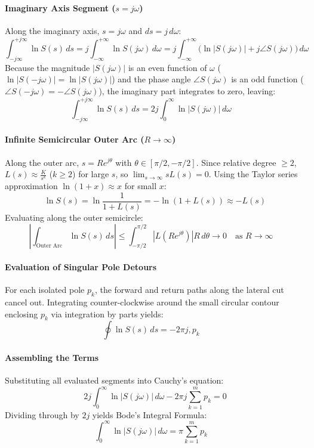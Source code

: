 \documentclass[12pt,onecolumn,twoside ]{article}
\begin{document}
	\paragraph{Imaginary Axis Segment ($s = j\omega$)}
	Along the imaginary axis, $s = j\omega$ and $ds = j\, d\omega$: \[
	\int_{-j\infty}^{+j\infty} \ln S(s)\, ds = j \int_{-\infty}^{+\infty} \ln S(j\omega)\, d\omega = j \int_{-\infty}^{+\infty} \big( \ln |S(j\omega)| + j \angle S(j\omega) \big)\, d\omega \quad
	\] Because the magnitude $|S(j\omega)|$ is an even function of $\omega$ ($\ln |S(-j\omega)| = \ln |S(j\omega)|$) and the phase angle $\angle S(j\omega)$ is an odd function ($\angle S(-j\omega) = -\angle S(j\omega)$), the imaginary part integrates to zero, leaving: \[
	\int_{-j\infty}^{+j\infty} \ln S(s)\, ds = 2j \int_{0}^{\infty} \ln |S(j\omega)|\, d\omega \quad
	\]
	\paragraph{Infinite Semicircular Outer Arc ($R \to \infty$)}
	Along the outer arc, $s = R e^{j\theta}$ with $\theta \in [\pi/2, -\pi/2]$. Since relative degree $\ge 2$, $L(s) \approx \frac{K}{s^k}$ ($k \ge 2$) for large $s$, so $\lim_{s \to \infty} s L(s) = 0$. Using the Taylor series approximation $\ln(1 + x) \approx x$ for small $x$: \[
	\ln S(s) = \ln \frac{1}{1 + L(s)} = -\ln(1 + L(s)) \approx -L(s)
	\] Evaluating along the outer semicircle: \[
	\left| \int_{\text{Outer Arc}} \ln S(s)\, ds \right| \le \int_{-\pi/2}^{\pi/2} |L(R e^{j\theta})| R\, d\theta \to 0 \quad \text{as } R \to \infty \quad
	\]
	\paragraph{Evaluation of Singular Pole Detours}
	For each isolated pole $p_k$, the forward and return paths along the lateral cut cancel out. Integrating counter-clockwise around the small circular contour enclosing $p_k$ via integration by parts yields: \[
	\oint \ln S(s)\, ds = -2\pi j , p_k \quad
	\]
	\paragraph{Assembling the Terms}
	Substituting all evaluated segments into Cauchy’s equation: \[
	2j \int_{0}^{\infty} \ln |S(j\omega)|\, d\omega - 2\pi j \sum_{k=1}^m p_k = 0
	\] Dividing through by $2j$ yields Bode’s Integral Formula: \[
	\int_{0}^{\infty} \ln |S(j\omega)|\, d\omega = \pi \sum_{k=1}^m p_k \quad
	\]
	
\end{document}
